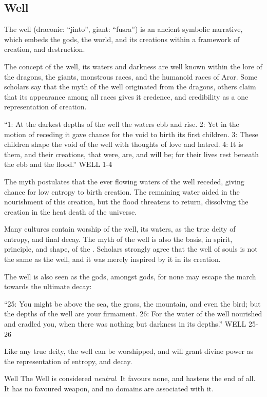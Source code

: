 \subsection{Well}
\label{sec:Well}

The well (draconic: ``jinto'', giant: ``fusra'') is an ancient symbolic
narrative, which embeds the gods, the world, and its creations within a
framework of creation, and destruction.

The concept of the well, its waters and darkness are well known within the lore
of the dragons, the giants, monstrous races, and the humanoid races of Aror.
Some scholars say that the myth of the well originated from the dragons, others
claim that its appearance among all races gives it credence, and credibility
as a one representation of creation.

\begin{displayquote}
  ``1: At the darkest depths of the well the waters ebb and rise. 2: Yet in the
  motion of receding it gave chance for the void to birth its first children. 3:
  These children shape the void of the well with thoughts of love and hatred. 4:
  It is them, and their creations, that were, are, and will be; for their lives
  rest beneath the ebb and the flood.'' WELL 1-4
\end{displayquote}

The myth postulates that the ever flowing waters of the well receded, giving
chance for low entropy to birth creation. The remaining water aided in the
nourishment of this creation, but the flood threatens to return, dissolving
the creation in the heat death of the universe.

Many cultures contain worship of the well, its waters, as the true deity of
entropy, and final decay. The myth of the well is also the basis, in spirit,
principle, and shape, of the . Scholars strongly
agree that the well of souls is not the same as the well, and it was merely
inspired by it in its creation.

The well is also seen as the gods, amongst gods, for none may escape the march
towards the ultimate decay:

\begin{displayquote}
  ``25: You might be above the sea, the grass, the mountain, and even the bird;
  but the depths of the well are your firmament. 26: For the water of the well
  nourished and cradled you, when there was nothing but darkness in its
  depths.'' WELL 25-26
\end{displayquote}

Like any true deity, the well can be worshipped, and will grant divine power as
the representation of entropy, and decay.

\begin{35e}{Well}
  The Well is considered \emph{neutral}. It favours none, and hastens the end of
  all. It has no favoured weapon, and no domains are associated with it.
\end{35e}
